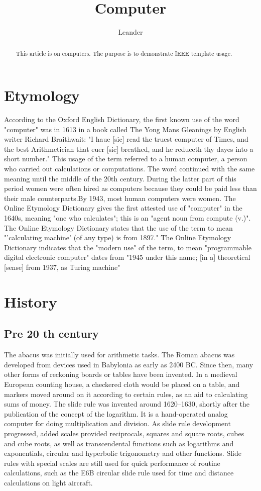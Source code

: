 \documentclass[a4paper,11pt]{IEEEtran}
\title{Computer}
\author{Leander}
\begin{document}
\maketitle
\tableofcontents

\begin{abstract}
This article is on computers.
The purpose is to demonstrate IEEE template usage.
\end{abstract}

\section{Etymology}
According to the Oxford English Dictionary, the first known use of the word "computer" was in 1613 in a book called The Yong Mans Gleanings by English writer Richard Braithwait: "I haue [sic] read the truest computer of Times, and the best Arithmetician that euer [sic] breathed, and he reduceth thy dayes into a short number." This usage of the term referred to a human computer, a person who carried out calculations or computations. The word continued with the same meaning until the middle of the 20th century. During the latter part of this period women were often hired as computers because they could be paid less than their male counterparts.By 1943, most human computers were women.
The Online Etymology Dictionary gives the first attested use of "computer" in the 1640s, meaning "one who calculates"; this is an "agent noun from compute (v.)". The Online Etymology Dictionary states that the use of the term to mean "'calculating machine' (of any type) is from 1897." The Online Etymology Dictionary indicates that the "modern use" of the term, to mean "programmable digital electronic computer" dates from "1945 under this name; [in a] theoretical [sense] from 1937, as Turing machine"

\section{History}
\subsection{Pre 20 th century}
The abacus was initially used for arithmetic tasks. The Roman abacus was developed from devices used in Babylonia as early as 2400 BC. Since then, many other forms of reckoning boards or tables have been invented. In a medieval European counting house, a checkered cloth would be placed on a table, and markers moved around on it according to certain rules, as an aid to calculating sums of money. 
The slide rule was invented around 1620–1630, shortly after the publication of the concept of the logarithm. It is a hand-operated analog computer for doing multiplication and division. As slide rule development progressed, added scales provided reciprocals, squares and square roots, cubes and cube roots, as well as transcendental functions such as logarithms and exponentials, circular and hyperbolic trigonometry and other functions. Slide rules with special scales are still used for quick performance of routine calculations, such as the E6B circular slide rule used for time and distance calculations on light aircraft. 
\end{document}
